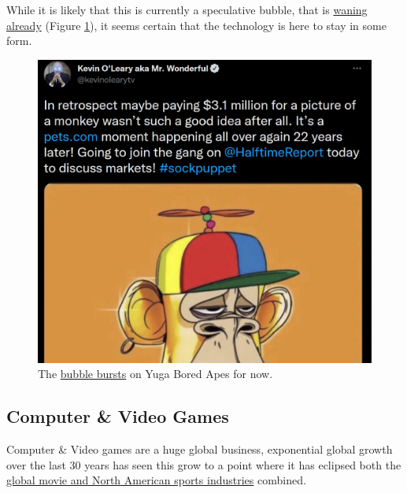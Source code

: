 
While it is likely that this is currently a speculative bubble, that is \href{https://www.bbc.co.uk/news/business-61102759}{waning already} (Figure \ref{fig:monkey}), it seems certain that the technology is here to stay in some form.\par

\begin{figure}[ht]\centering %
	\includegraphics{monkey}
	\caption{The \href{https://www.coingecko.com/en/nft/bored-ape-yacht-club}{bubble bursts} on Yuga Bored Apes for now.}
	\label{fig:monkey}
\end{figure}


\subsection{Computer \& Video Games}
Computer \& Video games are a huge global business, exponential global
growth over the last 30 years has seen this grow to a point where it has
eclipsed both the
\href{https://www.businessinsider.com/video-game-industry-revenues-exceed-sports-and-film-combined-idc-2020-12?r=US\&IR=T}{global
movie and North American sports industries} combined.


